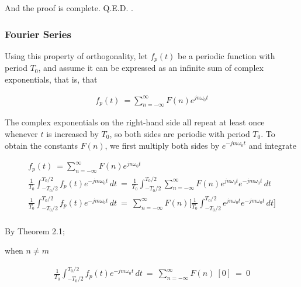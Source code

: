 \documentclass[10pt]{article}
\begin{document}
\noindent
And the proof is complete. \quad Q.E.D. \:\:  \cite{morrison1994fourier}.

\subsubsection{Fourier Series}
\hspace{\parindent} Using this property of orthogonality, let $f_p(t)$ be a periodic function with period $T_0$, and assume it can be expressed as an infinite sum of complex exponentials, that is, that

\begin{equation} \label{eq:2.22}
\begin{aligned}
    f_p(t) \: = \sum_{n=-\infty}^{\infty} F(n) e^{jn\omega_0t}
\end{aligned}
\end{equation}

The complex exponentials on the right-hand side all repeat at least once whenever $t$ is increased by $T_0$, so both sides are periodic with period $T_0$. To obtain the constants $F(n)$, we first multiply both sides by $e^{-jm\omega_0t}$ and integrate

\begin{equation} \label{eq:2.23}
\begin{aligned}
    f_p(t) \: = \sum_{n=-\infty}^{\infty} F(n) e^{jn\omega_0t} \\
    \frac{1}{T_0}\int_{-T_0/2}^{T_0/2} f_p(t) e^{-jm\omega_0t} \,dt \: = \: \frac{1}{T_0}\int_{-T_0/2}^{T_0/2}\sum_{n=-\infty}^{\infty} F(n) e^{jn\omega_0t} e^{-jm\omega_0t} \,dt \\
    \frac{1}{T_0}\int_{-T_0/2}^{T_0/2} f_p(t) e^{-jm\omega_0t} \,dt \: = \: \sum_{n=-\infty}^{\infty} F(n) \Big[ \frac{1}{T_0}\int_{-T_0/2}^{T_0/2} e^{jn\omega_0t} e^{-jm\omega_0t} \,dt \Big] \\
\end{aligned}
\end{equation}

\vspace{3mm}
\noindent
By Theorem 2.1;

\vspace{2mm}
when $n \neq m$ 

\begin{equation} \label{eq:2.24}
\begin{aligned}
    \frac{1}{T_0}\int_{-T_0/2}^{T_0/2} f_p(t) e^{-jm\omega_0t} \,dt \: = \: \sum_{n=-\infty}^{\infty} F(n) \: [0] \: = \: 0
\end{aligned}
\end{equation}
\end{document}
